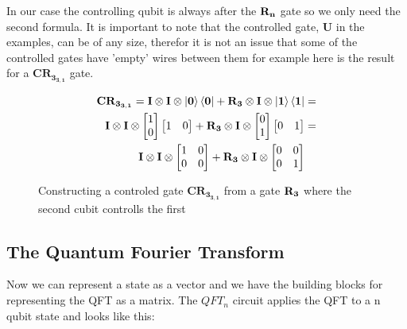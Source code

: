 In our case the controlling qubit is always after the $\mathbf{R_{n}}$ gate so we only need the second formula. 
It is important to note that the controlled gate, $\mathbf{U}$ in the examples, can be of any size, therefor it is not an issue that some of the controlled gates have 'empty' wires between them for example here is the result for a $\mathbf{CR_{3_{3,1}}}$ gate. 
\begin{figure}[H]
    \begin{align*}
        \mathbf{CR_{3_{3,1}}}=\mathbf{I}\otimes\mathbf{I}\otimes\ket{\mathbf{0}}\bra{\mathbf{0}} + \mathbf{R_{3}}\otimes\mathbf{I}\otimes\ket{\mathbf{1}}\bra{\mathbf{1}}&=\\
        \mathbf{I}\otimes\mathbf{I}\otimes
        \begin{bmatrix}
            1 \\
            0 \\
        \end{bmatrix}
        \begin{bmatrix}
            1 & 0 \\
        \end{bmatrix}+
        \mathbf{R_{3}}\otimes\mathbf{I}\otimes
        \begin{bmatrix}
            0 \\
            1 \\
        \end{bmatrix}
        \begin{bmatrix}
            0 & 1 \\
        \end{bmatrix}
        &=\\
        \mathbf{I}\otimes\mathbf{I}\otimes
        \begin{bmatrix}
            1 & 0 \\
            0 & 0 \\
        \end{bmatrix}+ 
        \mathbf{R_{3}}\otimes\mathbf{I}\otimes
        \begin{bmatrix}
            0 & 0 \\
            0 & 1 \\
        \end{bmatrix}& 
    \end{align*}
    \caption{Constructing a controled gate $\mathbf{CR_{3_{3,1}}}$ from a gate $\mathbf{R_{3}}$ where the second cubit controlls the first}
    \label{fig:CR3}
\end{figure}

\subsection{The Quantum Fourier Transform}
Now we can represent a state as a vector and we have the building blocks for representing the QFT as a matrix. The $QFT_n$ circuit applies the QFT to a n qubit state and looks like this:

